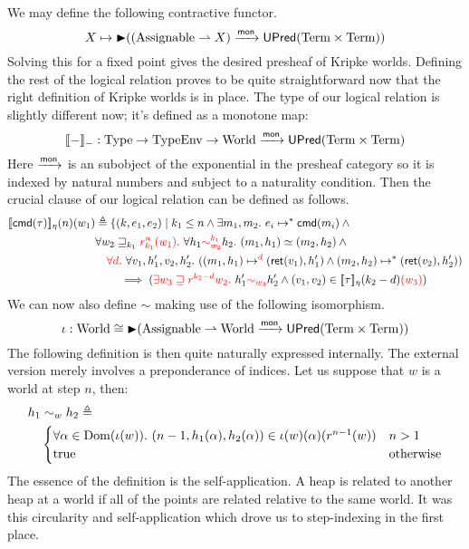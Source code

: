 We may define the following contractive functor.
\[
  X \mapsto \later ((\assignables \pto X) \mto \upred{\term \times \term})
\]
Solving this for a fixed point gives the desired presheaf of Kripke
worlds. Defining the rest of the logical relation proves to be quite
straightforward now that the right definition of Kripke worlds is in
place. The type of our logical relation is slightly different now;
it's defined as a monotone map:
\[
  \den{-}_{-} : \types \to \typesEnv \to \worlds \mto \upred{\term \times \term}
\]
Here $\mto$ is an subobject of the exponential in the presheaf
category so it is indexed by natural numbers and subject to a
naturality condition. Then the crucial clause of our logical relation
can be defined as follows.
\begin{align*}
  \den{\cmd{\tau}}_\eta(n)(w_1)& \triangleq \{(k, e_1, e_2) \mid
  k_1 \le n \land \exists m_1, m_2.\ \steps{e_i}{\cmd{m_i}} \land{}\\
  &\forall w_2 \breach_{k_1} \different{r_{k_1}^n(w_1)}.\ \forall h_1 \different{\sim_{w_2}^{k_1}} h_2.
  \ (m_1, h_1) \simeq (m_2, h_2) \land{}\\
  &\quad \different{\forall d.}\ \forall v_1, h_1', v_2, h_2'.
  \ (\stepsM[\different{d}]{m_1}{h_1}{\ret{v_1}}{h_1'} \land \stepsM{m_2}{h_2}{\ret{v_2}}{h_2'})\\
  &\qquad \implies (\different{\exists w_3 \breach r^{k_2 - d}w_2}.
    \ h_1' \different{\sim_{w_3}} h_2' \land (v_1, v_2) \in \den{\tau}_\eta(k_2 - d)\different{(w_3)})
\end{align*}
We can now also define $\sim$ making use of the following isomorphism.
\[
  \iota : \worlds \cong
  \later (\assignables \pto \worlds \mto \upred{\term \times \term})
\]
The following definition is then quite naturally expressed
internally. The external version merely involves a preponderance of
indices. Let us suppose that $w$ is a world at step $n$, then:
\begin{align*}
  h_1 &{}\sim_w h_2 \defs\\
  &\begin{cases}
    \forall \alpha \in \dom(\iota(w)).\ (n - 1, h_1(\alpha), h_2(\alpha)) \in \iota(w)(\alpha)(r^{n - 1}(w))
    & n > 1\\
    \text{true} & \text{otherwise}
  \end{cases}
\end{align*}
The essence of the definition is the self-application. A heap is
related to another heap at a world if all of the points are related
relative to the same world. It was this circularity and
self-application which drove us to step-indexing in the first place.

